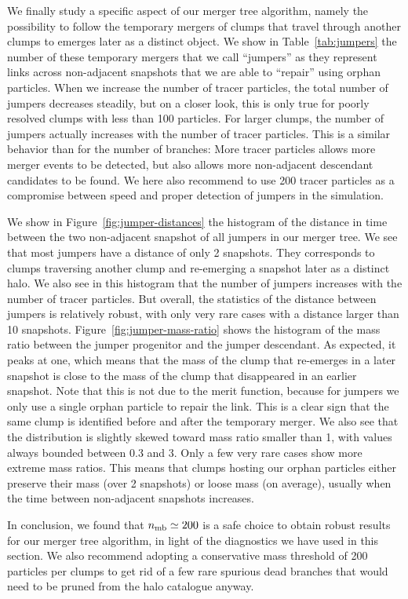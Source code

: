 We finally study a specific aspect of our merger tree algorithm,
namely the possibility to follow the temporary mergers of clumps that
travel through another clumps to emerges later as a distinct object.
We show in Table~\ref{tab:jumpers} the number of these temporary
mergers that we call ``jumpers'' as they represent links across
non-adjacent snapshots that we are able to ``repair'' using orphan
particles. When we increase the number of tracer particles, the total
number of jumpers decreases steadily, but on a closer look, this is
only true for poorly resolved clumps with less than 100 particles. For
larger clumps, the number of jumpers actually increases with the
number of tracer particles.  This is a similar behavior than for the
number of branches: More tracer particles allows more merger events to
be detected, but also allows more non-adjacent descendant candidates
to be found. We here also recommend to use 200 tracer particles as a
compromise between speed and proper detection of jumpers in the
simulation.

We show in Figure~\ref{fig:jumper-distances} the histogram of the
distance in time between the two non-adjacent snapshot of all jumpers
in our merger tree. We see that most jumpers have a distance of only 2
snapshots. They corresponds to clumps traversing another clump and
re-emerging a snapshot later as a distinct halo. We also see in
this histogram that the number of jumpers increases with the number of
tracer particles. But overall, the statistics of the distance between
jumpers is relatively robust, with only very rare cases with a
distance larger than 10 snapshots. Figure~\ref{fig:jumper-mass-ratio}
shows the histogram of the mass ratio between the jumper progenitor
and the jumper descendant.  As expected, it peaks at one, which means
that the mass of the clump that re-emerges in a later snapshot is
close to the mass of the clump that disappeared in an earlier
snapshot. Note that this is not due to the merit function, because for
jumpers we only use a single orphan particle to repair the link. This
is a clear sign that the same clump is identified before and after the
temporary merger.  We also see that the distribution is slightly
skewed toward mass ratio smaller than 1, with values always bounded
between 0.3 and 3. Only a few very rare cases show more extreme mass
ratios. This means that clumps hosting our orphan particles either
preserve their mass (over 2 snapshots) or loose mass (on average),
usually when the time between non-adjacent snapshots increases.

In conclusion, we found that $n_{\rm mb} \simeq 200$ is a safe choice
to obtain robust results for our merger tree algorithm, in light of
the diagnostics we have used in this section.  We also recommend
adopting a conservative mass threshold of 200 particles per clumps to
get rid of a few rare spurious dead branches that would need to be
pruned from the halo catalogue anyway.
